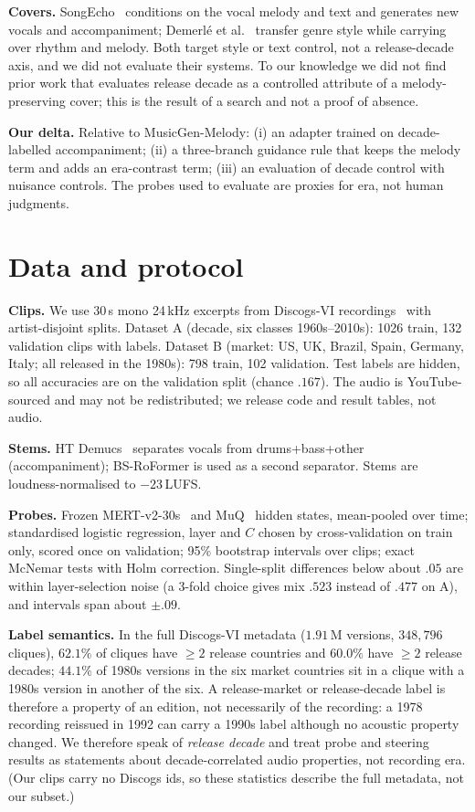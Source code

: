 \documentclass[10pt,twocolumn]{article}
\begin{document}
\textbf{Covers.} SongEcho~\cite{songecho2026} conditions on the vocal melody and text and generates new vocals and accompaniment; Demerl\'e et al.~\cite{demerle2024style} transfer genre style while carrying over rhythm and melody. Both target style or text control, not a release-decade axis, and we did not evaluate their systems. To our knowledge we did not find prior work that evaluates release decade as a controlled attribute of a melody-preserving cover; this is the result of a search and not a proof of absence.

\textbf{Our delta.} Relative to MusicGen-Melody: (i) an adapter trained on decade-labelled accompaniment; (ii) a three-branch guidance rule that keeps the melody term and adds an era-contrast term; (iii) an evaluation of decade control with nuisance controls. The probes used to evaluate are proxies for era, not human judgments.

\section{Data and protocol}\label{sec:data}
\textbf{Clips.} We use 30\,s mono 24\,kHz excerpts from Discogs-VI recordings~\cite{araz2024discogsvi} with artist-disjoint splits. Dataset A (decade, six classes 1960s--2010s): 1026 train, 132 validation clips with labels. Dataset B (market: US, UK, Brazil, Spain, Germany, Italy; all released in the 1980s): 798 train, 102 validation. Test labels are hidden, so all accuracies are on the validation split (chance $.167$). The audio is YouTube-sourced and may not be redistributed; we release code and result tables, not audio.

\textbf{Stems.} HT Demucs~\cite{rouard2022htdemucs} separates vocals from drums+bass+other (accompaniment); BS-RoFormer is used as a second separator. Stems are loudness-normalised to $-23$\,LUFS.

\textbf{Probes.} Frozen MERT-v2-30s~\cite{li2023mert} and MuQ~\cite{zhu2025muq} hidden states, mean-pooled over time; standardised logistic regression, layer and $C$ chosen by cross-validation on train only, scored once on validation; 95\% bootstrap intervals over clips; exact McNemar tests with Holm correction. Single-split differences below about $.05$ are within layer-selection noise (a 3-fold choice gives mix $.523$ instead of $.477$ on A), and intervals span about $\pm.09$.

\textbf{Label semantics.} In the full Discogs-VI metadata ($1.91$\,M versions, $348{,}796$ cliques), $62.1\%$ of cliques have $\geq 2$ release countries and $60.0\%$ have $\geq 2$ release decades; $44.1\%$ of 1980s versions in the six market countries sit in a clique with a 1980s version in another of the six. A release-market or release-decade label is therefore a property of an edition, not necessarily of the recording: a 1978 recording reissued in 1992 can carry a 1990s label although no acoustic property changed. We therefore speak of \emph{release decade} and treat probe and steering results as statements about decade-correlated audio properties, not recording era. (Our clips carry no Discogs ids, so these statistics describe the full metadata, not our subset.)
\end{document}
